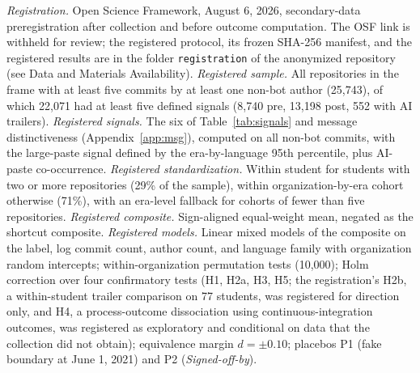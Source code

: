 \documentclass[acmsmall,screen,review,anonymous]{acmart}
\begin{document}
\textit{Registration.} Open Science Framework, August 6, 2026, secondary-data preregistration after collection and before outcome computation. The OSF link is withheld for review; the registered protocol, its frozen SHA-256 manifest, and the registered results are in the folder \texttt{registration} of the anonymized repository (see Data and Materials Availability). \textit{Registered sample.} All repositories in the frame with at least five commits by at least one non-bot author (25,743), of which 22,071 had at least five defined signals (8,740 pre, 13,198 post, 552 with AI trailers). \textit{Registered signals.} The six of Table~\ref{tab:signals} and message distinctiveness (Appendix~\ref{app:msg}), computed on all non-bot commits, with the large-paste signal defined by the era-by-language 95th percentile, plus AI-paste co-occurrence. \textit{Registered standardization.} Within student for students with two or more repositories (29\% of the sample), within organization-by-era cohort otherwise (71\%), with an era-level fallback for cohorts of fewer than five repositories. \textit{Registered composite.} Sign-aligned equal-weight mean, negated as the shortcut composite. \textit{Registered models.} Linear mixed models of the composite on the label, log commit count, author count, and language family with organization random intercepts; within-organization permutation tests (10,000); Holm correction over four confirmatory tests (H1, H2a, H3, H5; the registration's H2b, a within-student trailer comparison on 77 students, was registered for direction only, and H4, a process-outcome dissociation using continuous-integration outcomes, was registered as exploratory and conditional on data that the collection did not obtain); equivalence margin $d = \pm 0.10$; placebos P1 (fake boundary at June 1, 2021) and P2 (\textit{Signed-off-by}).
\end{document}
